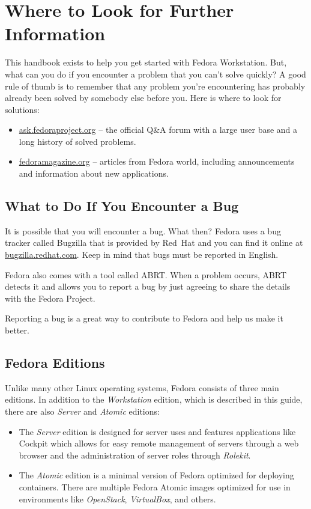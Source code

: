 \chapter*{Where to Look for Further Information}

This handbook exists to help you get started with Fedora Workstation. But, what can you do if you encounter a problem that you can't solve quickly? A good rule of thumb is to remember that any problem you're encountering has probably already been solved by somebody else before you. Here is where to look for solutions:
\begin{itemize}
\item\url{ask.fedoraproject.org} -- the official Q\&A forum with a large user base and a long history of solved problems.

\item\url{fedoramagazine.org} -- articles from Fedora world, including announcements and information about new applications.
\end{itemize}

\section*{What to Do If You Encounter a Bug}

It is possible that you will encounter a bug. What then? Fedora uses a bug tracker called Bugzilla that is provided by Red~Hat and you can find it online at \url{bugzilla.redhat.com}. Keep in mind that bugs must be reported in English.

Fedora also comes with a tool called ABRT. When a problem occurs, ABRT detects it and allows you to report a bug by just agreeing to share the details with the Fedora Project.

Reporting a bug is a great way to contribute to Fedora and help us make it better.

\section*{Fedora Editions}

Unlike many other Linux operating systems, Fedora consists of three main editions. In addition to the \emph{Workstation} edition, which is described in this guide, there are also \emph{Server} and \emph{Atomic} editions:
\begin{itemize}
\item The \emph{Server} edition is designed for server uses and features applications like Cockpit which allows for easy remote management of servers through a web browser and the administration of server roles through \emph{Rolekit}.

\item The \emph{Atomic} edition is a minimal version of Fedora optimized for deploying containers. There are multiple Fedora Atomic images optimized for use in environments like \emph{OpenStack}, \emph{VirtualBox}, and others.
\end{itemize}

